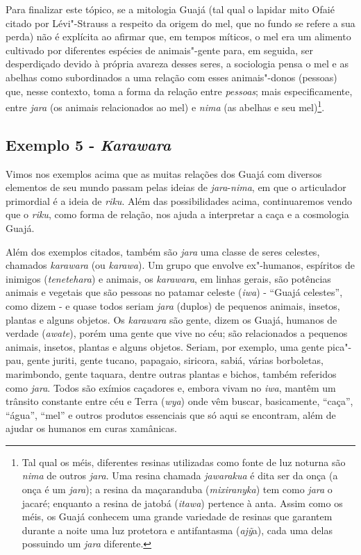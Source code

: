 Para finalizar este tópico, se a mitologia Guajá (tal qual o lapidar
mito Ofaié citado por Lévi"-Strauss a respeito da origem do mel, que no
fundo se refere a sua perda) não é explícita ao afirmar que, em tempos
míticos, o mel era um alimento cultivado por diferentes espécies de
animais"-gente para, em seguida, ser desperdiçado devido à própria
avareza desses seres, a sociologia pensa o mel e as abelhas como
subordinados a uma relação com esses animais"-donos (pessoas) que, nesse
contexto, toma a forma da relação entre \emph{pessoas}; mais
especificamente, entre \emph{jara} (os animais relacionados ao mel) e
\emph{nima} (as abelhas e seu mel)\footnote{Tal qual os méis, diferentes
  resinas utilizadas como fonte de luz noturna são \emph{nima} de outros
  \emph{jara}. Uma resina chamada \emph{jawarakua} é dita ser da onça (a
  onça é um \emph{jara}); a resina da maçaranduba (\emph{mixiranyka})
  tem como \emph{jara} o jacaré; enquanto a resina de jatobá
  (\emph{itawa}) pertence à anta. Assim como os méis, os Guajá conhecem
  uma grande variedade de resinas que garantem durante a noite uma luz
  protetora e antifantasma (\emph{ajỹ}a), cada uma delas possuindo um
  \emph{jara} diferente.}.

\subsection{Exemplo 5 - \emph{Karawara}}

Vimos nos exemplos acima que as muitas relações dos Guajá com diversos
elementos de seu mundo passam pelas ideias de \emph{jara}-\emph{nima},
em que o articulador primordial é a ideia de \emph{riku}. Além das
possibilidades acima, continuaremos vendo que o \emph{riku}, como forma
de relação, nos ajuda a interpretar a caça e a cosmologia Guajá.

Além dos exemplos citados, também são \emph{jara} uma classe de seres
celestes, chamados \emph{karawara} (ou \emph{karawa}). Um grupo que
envolve ex"-humanos, espíritos de inimigos (\emph{tenetehara}) e animais,
os \emph{karawara}, em linhas gerais, são potências animais e vegetais
que são pessoas no patamar celeste (\emph{iwa}) - ``Guajá celestes'',
como dizem - e quase todos seriam \emph{jara} (duplos) de pequenos
animais, insetos, plantas e alguns objetos. Os \emph{karawara} são
gente, dizem os Guajá, humanos de verdade (\emph{awate}), porém uma
gente que vive no céu; são relacionados a pequenos animais, insetos,
plantas e alguns objetos. Seriam, por exemplo, uma gente pica"-pau, gente
juriti, gente tucano, papagaio, siricora, sabiá, várias borboletas,
marimbondo, gente taquara, dentre outras plantas e bichos, também
referidos como \emph{jara}. Todos são exímios caçadores e, embora vivam
no \emph{iwa}, mantêm um trânsito constante entre céu e Terra
(\emph{wya}) onde vêm buscar, basicamente, ``caça'', ``água'', ``mel'' e
outros produtos essenciais que só aqui se encontram, além de ajudar os
humanos em curas xamânicas.

